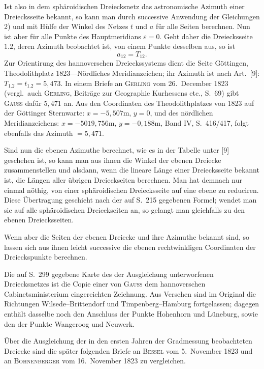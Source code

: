 \documentclass[12pt,a4paper]{article}
\theoremstyle{plain}
\theoremstyle{definition}
\theoremstyle{remark}
\begin{document}
Ist also in dem sph\"aroidischen Dreiecksnetz das astronomische Azimuth einer Dreiecksseite bekannt, so kann man durch successive Anwendung der Gleichungen 2) und mit H\"ulfe der Winkel des Netzes $t$ und $a$ f\"ur alle Seiten berechnen. Nun ist aber f\"ur alle Punkte des Hauptmeridians $\varepsilon = 0$. Geht daher die Dreiecksseite $1.2$, deren Azimuth beobachtet ist, von einem Punkte desselben aus, so ist
\[a_{12} = T_{12}.\]
Zur Orientirung des hannoverschen Dreieckssystems dient die Seite G\"ottingen, Theodolithplatz 1823---N\"ordliches Meridianzeichen; ihr Azimuth ist nach Art.\ [9]: $T_{1.2} = t_{1.2} = 5{,}473$. In einem Briefe an \textsc{Gerling} vom 26.\ December 1823 (vergl.\ auch \textsc{Gerling}, Beitr\"age zur Geographie Kurhessens etc., S.\ 69) gibt \textsc{Gauss} daf\"ur $5{,}471$ an. Aus den Coordinaten des Theodolithplatzes von 1823 auf der G\"ottinger Sternwarte: $x = -5{,}507$m, $y = 0$, und des n\"ordlichen Meridianzeichens: $x = -5019{,}756$m, $y = -0{,}188$m, Band IV, S.\ 416/417, folgt ebenfalls das Azimuth $= 5{,}471$.

Sind nun die ebenen Azimuthe berechnet, wie es in der Tabelle unter [9] geschehen ist, so kann man aus ihnen die Winkel der ebenen Dreiecke zusammenstellen und alsdann, wenn die lineare L\"ange einer Dreiecksseite bekannt ist, die L\"angen aller \"ubrigen Dreieckseiten berechnen. Man hat demnach nur einmal n\"othig, von einer sph\"aroidischen Dreiecksseite auf eine ebene zu reduciren. Diese \"Ubertragung geschieht nach der auf S.\ 215 gegebenen Formel; wendet man sie auf alle sph\"aroidischen Dreieckseiten an, so gelangt man gleichfalls zu den ebenen Dreiecksseiten.

Wenn aber die Seiten der ebenen Dreiecke und ihre Azimuthe bekannt sind, so lassen sich aus ihnen leicht successive die ebenen rechtwinkligen Coordinaten der Dreieckspunkte berechnen.

Die auf S.\ 299 gegebene Karte des der Ausgleichung unterworfenen Dreiecksnetzes ist die Copie einer von \textsc{Gauss} dem hannoverschen Cabinetsministerium eingereichten Zeichnung. Aus Versehen sind im Original die Richtungen Wilsede--Brittendorf und Timpenberg--Hamburg fortgelassen; dagegen enth\"alt dasselbe noch den Anschluss der Punkte Hohenhorn und L\"uneburg, sowie den der Punkte Wangeroog und Neuwerk.

\"Uber die Ausgleichung der in den ersten Jahren der Gradmessung beobachteten Dreiecke sind die sp\"ater folgenden Briefe an \textsc{Bessel} vom 5.\ November 1823 und an \textsc{Bohnenberger} vom 16.\ November 1823 zu vergleichen.
\end{document}
